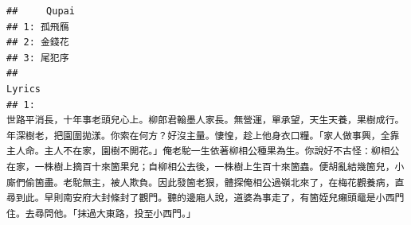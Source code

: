 \documentclass[]{article}
\begin{document}
\begin{verbatim}
##     Qupai
## 1: 孤飛鴈
## 2: 金錢花
## 3: 尾犯序
##                                                                                                                                                                                                                                                                                                                                                                                                                                                                                                                                                                                                                                                                                                                                                                                                                                                                                                                                                                                                                                                                                                                                                                                                                                                                        Lyrics
## 1:                                                                                                                                                                                                                                                                                                                                                                                                                                                                                                                                                                                                                                                                                                         世路平消長，十年事老頭兒心上。柳郎君翰墨人家長。無營運，單承望，天生天養，果樹成行。年深樹老，把園圍拋漾。你索在何方？好沒主量。悽惶，趁上他身衣口糧。「家人做事興，全靠主人命。主人不在家，園樹不開花。」俺老駝一生依著柳相公種果為生。你說好不古怪：柳相公在家，一株樹上摘百十來箇果兒；自柳相公去後，一株樹上生百十來箇蟲。便胡亂結幾箇兒，小廝們偷箇盡。老駝無主，被人欺負。因此發箇老狠，體探俺相公過嶺北來了，在梅花觀養病，直尋到此。早則南安府大封條封了觀門。聽的邊廂人說，道婆為事走了，有箇姪兒癩頭黿是小西門住。去尋問他。「抹過大東路，投至小西門。」

\end{verbatim}
\end{document}
